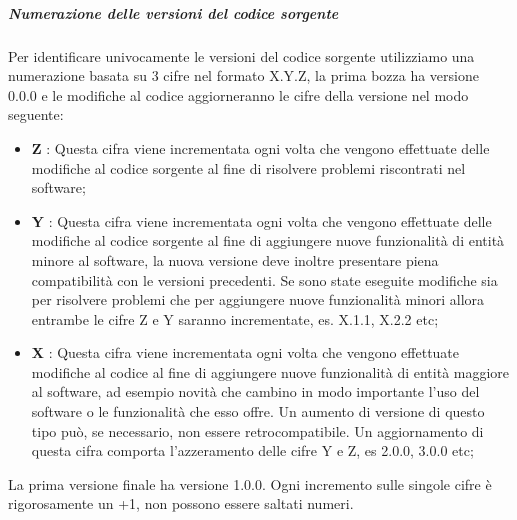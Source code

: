 		\subparagraph*{Numerazione delle versioni del codice sorgente}
		Per identificare univocamente le versioni del codice sorgente utilizziamo una numerazione basata su 3 cifre nel formato X.Y.Z, la prima bozza ha versione 0.0.0 e le modifiche al codice aggiorneranno le cifre della versione nel modo seguente:
		\begin{itemize}
			\item \textbf{Z} : Questa cifra viene incrementata ogni volta che vengono effettuate delle modifiche al codice sorgente al fine di risolvere problemi riscontrati nel software;
			\item \textbf{Y} : Questa cifra viene incrementata ogni volta che vengono effettuate delle modifiche al codice sorgente al fine di aggiungere nuove funzionalità di entità minore al software, la nuova versione deve inoltre presentare piena compatibilità con le versioni precedenti. Se sono state eseguite modifiche sia per risolvere problemi che per aggiungere nuove funzionalità minori allora entrambe le cifre Z e Y saranno incrementate, es. X.1.1, X.2.2 etc;
			\item \textbf{X} : Questa cifra viene incrementata ogni volta che vengono effettuate modifiche al codice al fine di aggiungere nuove funzionalità di entità maggiore al software, ad esempio novità che cambino in modo importante l'uso del software o le funzionalità che esso offre. Un aumento di versione di questo tipo può, se necessario, non essere retrocompatibile. Un aggiornamento di questa cifra comporta l'azzeramento delle cifre Y e Z, es 2.0.0, 3.0.0 etc;
		\end{itemize}
		La prima versione finale ha versione 1.0.0.
		\newline
		Ogni incremento sulle singole cifre è rigorosamente un +1, non possono essere saltati numeri.
		
